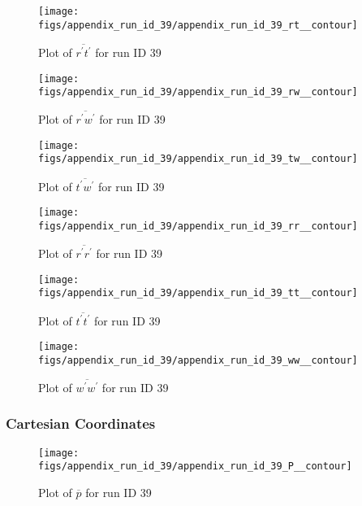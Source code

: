 \begin{figure}[H]
\centering
\texttt{[image: figs/appendix\_run\_id\_39/appendix\_run\_id\_39\_rt\_\_contour]}
\caption{Plot of $\overline{r^\prime t^\prime}$ for run ID 39}
\label{fig:appendix_run_id_39_rt__contour}
\end{figure}


\begin{figure}[H]
\centering
\texttt{[image: figs/appendix\_run\_id\_39/appendix\_run\_id\_39\_rw\_\_contour]}
\caption{Plot of $\overline{r^\prime w^\prime}$ for run ID 39}
\label{fig:appendix_run_id_39_rw__contour}
\end{figure}


\begin{figure}[H]
\centering
\texttt{[image: figs/appendix\_run\_id\_39/appendix\_run\_id\_39\_tw\_\_contour]}
\caption{Plot of $\overline{t^\prime w^\prime}$ for run ID 39}
\label{fig:appendix_run_id_39_tw__contour}
\end{figure}


\begin{figure}[H]
\centering
\texttt{[image: figs/appendix\_run\_id\_39/appendix\_run\_id\_39\_rr\_\_contour]}
\caption{Plot of $\overline{r^\prime r^\prime}$ for run ID 39}
\label{fig:appendix_run_id_39_rr__contour}
\end{figure}


\begin{figure}[H]
\centering
\texttt{[image: figs/appendix\_run\_id\_39/appendix\_run\_id\_39\_tt\_\_contour]}
\caption{Plot of $\overline{t^\prime t^\prime}$ for run ID 39}
\label{fig:appendix_run_id_39_tt__contour}
\end{figure}


\begin{figure}[H]
\centering
\texttt{[image: figs/appendix\_run\_id\_39/appendix\_run\_id\_39\_ww\_\_contour]}
\caption{Plot of $\overline{w^\prime w^\prime}$ for run ID 39}
\label{fig:appendix_run_id_39_ww__contour}
\end{figure}


\subsubsection{Cartesian Coordinates}
\begin{figure}[H]
\centering
\texttt{[image: figs/appendix\_run\_id\_39/appendix\_run\_id\_39\_P\_\_contour]}
\caption{Plot of $\overline{p}$ for run ID 39}
\label{fig:appendix_run_id_39_P__contour}
\end{figure}


